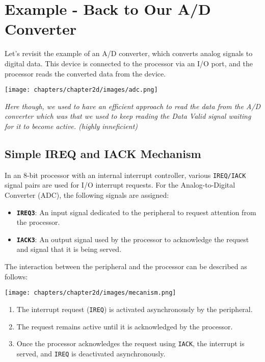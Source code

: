 \section{Example - Back to Our A/D Converter}
Let's revisit the example of an A/D converter, which converts analog signals to digital data. This device is connected to the processor via an I/O port, and the processor reads the converted data from the device. \\
\begin{center}
    \texttt{[image: chapters/chapter2d/images/adc.png]}
\end{center}
\textit{Here though, we used to have an efficient approach to read the data from the A/D converter which was that we used to keep reading the Data Valid signal waiting for it to become active. (highly inneficient)} \\

\subsection{Simple IREQ and IACK Mechanism}

In an 8-bit processor with an internal interrupt controller, various \texttt{IREQ/IACK} signal pairs are used for I/O interrupt requests. For the Analog-to-Digital Converter (ADC), the following signals are assigned:

\begin{itemize}
    \item \textbf{\texttt{IREQ3}}: An input signal dedicated to the peripheral to request attention from the processor.
    \item \textbf{\texttt{IACK3}}: An output signal used by the processor to acknowledge the request and signal that it is being served.
\end{itemize}

The interaction between the peripheral and the processor can be described as follows:
\begin{center}
    \texttt{[image: chapters/chapter2d/images/mecanism.png]}
\end{center}
\begin{enumerate}
    \item The interrupt request (\texttt{IREQ}) is activated asynchronously by the peripheral.
    \item The request remains active until it is acknowledged by the processor.
    \item Once the processor acknowledges the request using \texttt{IACK}, the interrupt is served, and \texttt{IREQ} is deactivated asynchronously.
\end{enumerate}

